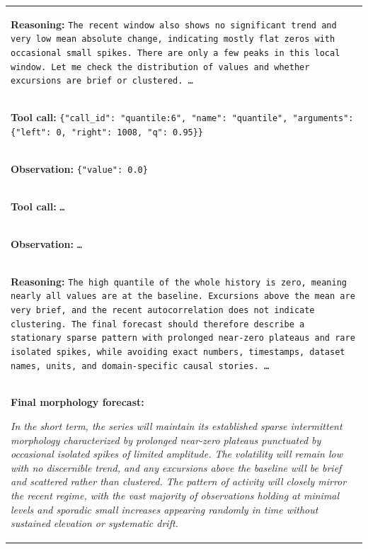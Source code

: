 \documentclass[11pt]{article}
\begin{document}
\begin{table}[t]
\begin{tabular}{p{}}
\hdashline

\colorbox{green!10}{\parbox{0.95\textwidth}{%
\textbf{Reasoning:}
\texttt{The recent window also shows no significant trend and very low mean
absolute change, indicating mostly flat zeros with occasional small spikes.
There are only a few peaks in this local window. Let me check the distribution
of values and whether excursions are brief or clustered. \ldots}
}} \\

\hdashline

\colorbox{red!10}{\parbox{0.95\textwidth}{%
\textbf{Tool call:}
\texttt{\{"call\_id": "quantile:6", "name": "quantile", "arguments":
\{"left": 0, "right": 1008, "q": 0.95\}\}}
}} \\

\colorbox{blue!10}{\parbox{0.95\textwidth}{%
\textbf{Observation:}
\texttt{\{"value": 0.0\}}
}} \\

\hdashline

\colorbox{red!10}{\parbox{0.95\textwidth}{%
\textbf{Tool call:}
\texttt{\ldots}
}} \\

\colorbox{blue!10}{\parbox{0.95\textwidth}{%
\textbf{Observation:}
\texttt{\ldots}
}} \\

\hdashline

\colorbox{green!10}{\parbox{0.95\textwidth}{%
\textbf{Reasoning:}
\texttt{The high quantile of the whole history is zero, meaning nearly all
values are at the baseline. Excursions above the mean are very brief, and the
recent autocorrelation does not indicate clustering. The final forecast should
therefore describe a stationary sparse pattern with prolonged near-zero
plateaus and rare isolated spikes, while avoiding exact numbers, timestamps,
dataset names, units, and domain-specific causal stories. \ldots}
}} \\

\hdashline

\colorbox{gray!10}{\parbox{0.95\textwidth}{%
\textbf{Final morphology forecast:}

\textit{In the short term, the series will maintain its established sparse
intermittent morphology characterized by prolonged near-zero plateaus
punctuated by occasional isolated spikes of limited amplitude. The volatility
will remain low with no discernible trend, and any excursions above the
baseline will be brief and scattered rather than clustered. The pattern of
activity will closely mirror the recent regime, with the vast majority of
observations holding at minimal levels and sporadic small increases appearing
randomly in time without sustained elevation or systematic drift.}

}}
\end{tabular}
\end{table}
\end{document}
